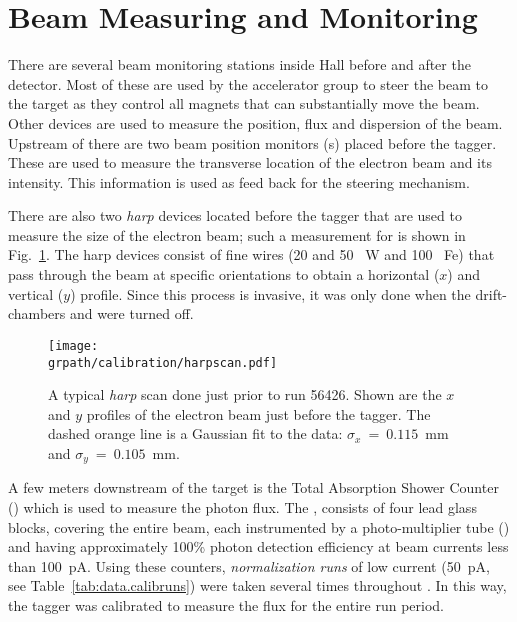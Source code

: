 \section{\label{sec:clas.beam}Beam Measuring and Monitoring}

There are several beam monitoring stations inside Hall  before and after the  detector. Most of these are used by the accelerator group to steer the beam to the target as they control all magnets that can substantially move the beam. Other devices are used to measure the position, flux and dispersion of the beam. Upstream of  there are two beam position monitors (s\label{abbr:bpm}) placed before the tagger. These are used to measure the transverse location of the electron beam and its intensity. This information is used as feed back for the steering mechanism.

There are also two \emph{harp} devices located before the tagger that are used to measure the size of the electron beam; such a measurement for  is shown in Fig.~\ref{fig:clas.beam.harpscan}. The harp devices consist of fine wires (20 and 50~{\um} W and 100~{\um} Fe) that pass through the beam at specific orientations to obtain a horizontal ($x$) and vertical ($y$) profile. Since this process is invasive, it was only done when the drift-chambers and  were turned off.

\begin{figure}\begin{center}
\texttt{[image: \\grpath/calibration/harpscan.pdf]}
\caption[Example \emph{harp} Scan for ]{\label{fig:clas.beam.harpscan}{}A typical \emph{harp} scan done just prior to run 56426. Shown are the $x$ and $y$ profiles of the electron beam just before the tagger. The dashed orange line is a Gaussian fit to the data: $\sigma_x~=~0.115$~mm and $\sigma_y~=~0.105$~mm.}
\end{center}\end{figure}

A few meters downstream of the target is the Total Absorption Shower Counter (\label{abbr:tasc}) which is used to measure the photon flux. The , consists of four lead glass blocks, covering the entire beam, each instrumented by a photo-multiplier tube (\label{abbr:pmt}) and having approximately 100\% photon detection efficiency at beam currents less than 100~pA\cite{clas.tagger,clas.tagger.calib}. Using these counters, \emph{normalization runs} of low current (50~pA, see Table~\ref{tab:data.calibruns}) were taken several times throughout . In this way, the tagger was calibrated to measure the flux for the entire run period.
